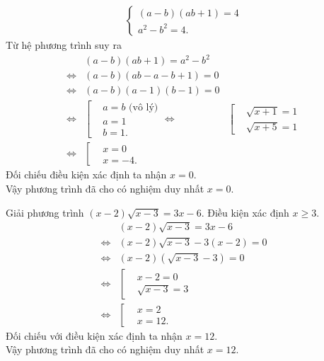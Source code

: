 \begin{bt}
{		\begin{align*}
		\begin{cases}
		(a - b)(ab + 1) = 4 \\
		a^2 - b^2 = 4.
		\end{cases}
		\end{align*}
		Từ hệ phương trình suy ra
		\begin{align*}
		& (a - b)(ab + 1) = a^2 - b^2 \\
		\Leftrightarrow & (a - b)(ab - a - b + 1) = 0 \\
		\Leftrightarrow & (a - b)(a - 1)(b - 1) = 0 \\
		\Leftrightarrow & \left[\begin{aligned} & a = b \text{ (vô lý)} \\& a = 1 \\& b = 1.  \end{aligned}\right.
		\Leftrightarrow & \left[\begin{aligned} & \sqrt{x + 1} = 1 \\& \sqrt{x + 5} = 1  \end{aligned}\right. \\
		\Leftrightarrow & \left[\begin{aligned} & x = 0 \\& x = -4.  \end{aligned}\right.
		\end{align*}
		Đối chiếu điều kiện xác định ta nhận $x = 0$.\\
		Vậy phương trình đã cho có nghiệm duy nhất $x = 0$.
	}
\end{bt}



\begin{bt}%
	Giải phương trình $(x - 2)\sqrt{x - 3} = 3x - 6$.
	\loigiai
	{
		Điều kiện xác định $x \geq 3$.
		\begin{align*}
		& (x - 2)\sqrt{x - 3} = 3x - 6 \\
		\Leftrightarrow & (x - 2) \sqrt{x - 3} - 3(x - 2) = 0 \\
		\Leftrightarrow & (x - 2)\left( \sqrt{x - 3} - 3 \right) = 0 \\
		\Leftrightarrow & \left[\begin{aligned} & x - 2 = 0 \\& \sqrt{x - 3} = 3  \end{aligned}\right.\\
		\Leftrightarrow & \left[\begin{aligned} & x = 2 \\& x = 12.  \end{aligned}\right.
		\end{align*}
		Đối chiếu với điều kiện xác định ta nhận $x = 12$.\\
		Vậy phương trình đã cho có nghiệm duy nhất $x = 12$.
	}
\end{bt}


